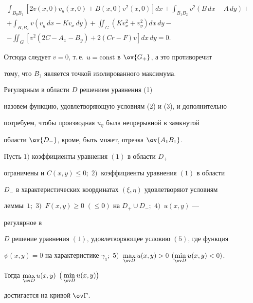 \begin{pf}
\begin{multline} 


\int_{B_0B_1}[2v(x,0)v_y(x,0)+B(x,0)v^2(x,0)]dx+ 


\int_{B_1B_2}v^2(B\,dx-A\,dy)+ \\ 


% 


+\int_{B_1B_2}v(v_y\,dx-K v_x\,dy)+\iint_G (K v^2_x+v^2_y)dx\,dy- \\ 


% 


-\iint_G[v^2(2C-A_x-B_y)+2(C r-F)v]dx\,dy=0. 


\end{multline} 


Отсюда следует $v=0$, т.\,е. $u=\operatorname{const}$ в $\ov{G_+}$, а это противоречит 


тому, что $B_1$ является точкой изолированного максимума.


\end{pf}


 


\begin{defn} 


Регулярным в области $D$ решением уравнения (1) 


назовем функцию, удовлетворяющую условиям (2) и (3), и дополнительно 


потребуем, чтобы производная $u_\eta$ была непрерывной в замкнутой 


области $\ov{D_-}$, кроме, быть может, отрезка $\ov{A_1B_1}$. 


\end{defn} 


 


\begin{thm} 


Пусть $1)$ коэффициенты уравнения $(1)$ в области $D_+$ 


ограничены и $C(x,y)\le0;$ $2)$~коэффициенты уравнения $(1)$ в области 


$D_-$ в характеристических координатах $(\xi,\eta)$ удовлетворяют условиям 


леммы~$1;$ $3)$~$F(x,y)\ge0$ $(\le0)$ на $D_+\cup D_-;$ $4)$~$u(x,y)$ --- 


регулярное в 


$D$ решение уравнения $(1)$, удовлетворяющее условию $(5)$, где функция 


$\psi(x,y)=0$ на характеристике $\gamma_1;$ $5)$~$\max\limits_{\ov 


D}u(x,y)>0$ $(\min\limits_{\ov D}u(x,y)<0)$. 


Тогда $\max\limits_{\ov D}u(x,y)$ $\big(\min\limits_{\ov D}u(x,y)\big)$ 


достигается на кривой $\ov\Gamma$. 


\end{thm} 


